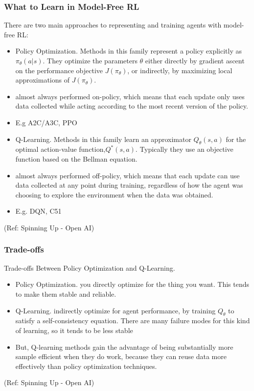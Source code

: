 \begin{frame}[fragile]\frametitle{What to Learn in Model-Free RL}

There are two main approaches to representing and training agents with model-free RL:

\begin{itemize}
\item Policy Optimization. Methods in this family represent a policy explicitly as $\pi_{\theta}(a|s)$. They optimize the parameters $\theta$ either directly by gradient ascent on the performance objective $J(\pi_{\theta})$, or indirectly, by maximizing local approximations of $J(\pi_{\theta})$. 
\item  almost always performed on-policy, which means that each update only uses data collected while acting according to the most recent version of the policy.
\item E.g A2C/A3C, PPO
\item Q-Learning. Methods in this family learn an approximator $Q_{\theta}(s,a)$ for the optimal action-value function,$ Q^*(s,a)$. Typically they use an objective function based on the Bellman equation.
\item almost always performed off-policy, which means that each update can use data collected at any point during training, regardless of how the agent was choosing to explore the environment when the data was obtained. 
\item E.g. DQN, C51
\end{itemize}

{\tiny (Ref: Spinning Up - Open AI)}
\end{frame}

\begin{frame}[fragile]\frametitle{Trade-offs}

Trade-offs Between Policy Optimization and Q-Learning. 

\begin{itemize}
\item Policy Optimization. you directly optimize for the thing you want. This tends to make them stable and reliable. 
\item Q-Learning. indirectly optimize for agent performance, by training $Q_{\theta}$ to satisfy a self-consistency equation. There are many failure modes for this kind of learning, so it tends to be less stable
\item But, Q-learning methods gain the advantage of being substantially more sample efficient when they do work, because they can reuse data more effectively than policy optimization techniques.
\end{itemize}

{\tiny (Ref: Spinning Up - Open AI)}
\end{frame}

